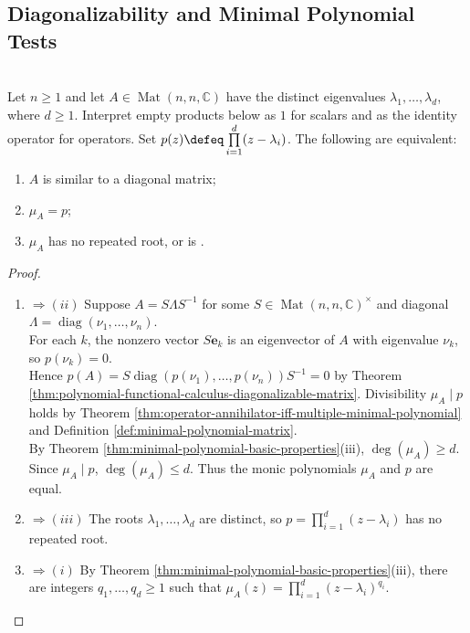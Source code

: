\subsection{Diagonalizability and Minimal Polynomial Tests}

\begin{theorem} \label{thm:diagonalizable-iff-minimal-polynomial-squarefree} \\
Let $n\geq1$ and let $A\in\operatorname{Mat}(n,n,\mathbb{C})$ have the distinct eigenvalues $\lambda_1,\ldots,\lambda_d$, where $d\geq1$. Interpret empty products below as $1$ for scalars and as the identity operator for operators. Set $p(z)\defeq\prod\limits_{i=1}^{d}(z-\lambda_i)$. The following are equivalent:
\begin{enumerate}[label=(\roman*)]
\setlength{\itemsep}{0pt}
\item $A$ is similar to a diagonal matrix;
\item $\mu_A=p$;
\item $\mu_A$ has no repeated root, or is .
\end{enumerate}
\begin{proof}
\begin{enumerate}[label=(\roman*)]
\setlength{\itemsep}{0pt}
\item[$(i)$] $\Rightarrow (ii)$ Suppose $A=S\Lambda S^{-1}$ for some $S\in\operatorname{Mat}(n,n,\mathbb{C})^{\times}$ and diagonal $\Lambda=\operatorname{diag}(\nu_1,\ldots,\nu_n)$.\\
For each $k$, the nonzero vector $S\mathbf{e}_k$ is an eigenvector of $A$ with eigenvalue $\nu_k$, so $p(\nu_k)=0$.\\
Hence $p(A)=S\operatorname{diag}(p(\nu_1),\ldots,p(\nu_n))S^{-1}=0$ by Theorem \ref{thm:polynomial-functional-calculus-diagonalizable-matrix}. Divisibility $\mu_A\mid p$ holds by Theorem \ref{thm:operator-annihilator-iff-multiple-minimal-polynomial} and Definition \ref{def:minimal-polynomial-matrix}.\\
By Theorem \ref{thm:minimal-polynomial-basic-properties}(iii), $\deg(\mu_A)\geq d$. Since $\mu_A\mid p$, $\deg(\mu_A)\leq d$. Thus the monic polynomials $\mu_A$ and $p$ are equal.
\item[$(ii)$] $\Rightarrow (iii)$ The roots $\lambda_1,\ldots,\lambda_d$ are distinct, so $p=\prod\limits_{i=1}^{d}(z-\lambda_i)$ has no repeated root.
\item[$(iii)$] $\Rightarrow (i)$ By Theorem \ref{thm:minimal-polynomial-basic-properties}(iii), there are integers $q_1,\ldots,q_d\geq1$ such that $\mu_A(z)=\prod\limits_{i=1}^{d}(z-\lambda_i)^{q_i}$.\\

\end{enumerate}
\end{proof}
\end{theorem}
